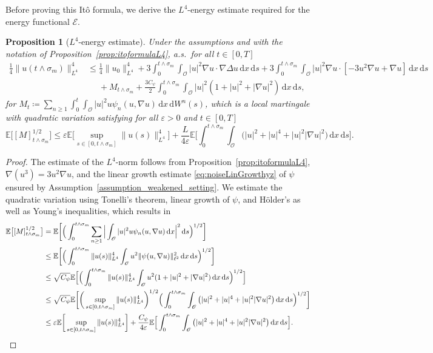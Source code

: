 \documentclass[reqno]{amsart}
\newtheorem{proposition}[Satz]{Proposition}
\newcommand{\E}{\mathbb{E}}
\newcommand{\sO}{\mathscr{O}}
\newcommand{\ce}{\coloneqq}
\newcommand{\1}{\mathbf{1}}
\newcommand{\grad}{\nabla}
\newcommand{\ds}{\,\mathrm{d}s}
\newcommand{\dx}{\,\mathrm{d}x}
\newcommand{\dWsn}{\,\mathrm{d}W^n(s)}
\newcommand{\intt}{\int_0^t}
\newcommand{\inttm}{\int_0^{t\wedge\sigma_m}}
\newcommand{\intsO}{\int_{\sO}}
\begin{document}
Before proving this Itô formula, we derive the $L^4$-energy estimate required for the energy functional $\mathcal{E}$.

\begin{proposition}[$L^4$-energy estimate] \label{prop:L4energyEstimate}
Under the assumptions and with the notation of Proposition~\ref{prop:itoformulaL4}, 
 a.s.\ for all $t\in[0,T]$
    \begin{align}\label{eq:L4energyEst}
        \frac{1}{4}\|u(t\land \sigma_m)\|_{L^4}^4 &\le \frac{1}{4}\|u_0\|_{L^4}^4 +
         3 \inttm\intsO |u|^2 \grad u \cdot \grad \Delta u \dx\ds + 3 \inttm\intsO |u|^2 \grad u \cdot [- 3u^2 \grad u + \grad u] \dx\ds \nonumber\\
        &\phantom{\le } + M_{t\land \sigma_m} + \frac{3C_\psi}{2} \inttm\intsO |u|^2 (1+|u|^2 + |\grad u|^2)  \dx \ds,
    \end{align}
    for $M_t \ce \sum_{n \geq 1} \intt\intsO |u|^2 u \psi_n(u, \grad u) \dx \dWsn$, which is a local martingale with quadratic variation satisfying for all $\varepsilon>0$ and $t\in [0,T]$
    \begin{equation}
    \label{eq:M1quadrVarEstimate}
     \E\big[[M]_{t\wedge \sigma_m}^{1/2}\big]\le  \varepsilon\E\bigg[\sup_{s\in[0,t\land \sigma_m]} \|u(s)\|^4_{L^4}\bigg]
    +\frac{L}{4\varepsilon}\E\Big[\inttm  \intsO \big(|u|^2+|u|^4+|u|^2|\grad u|^2\big)\dx\ds\Big].
    \end{equation}
\end{proposition}
\begin{proof}
     The estimate of the $L^4$-norm follows from Proposition~\ref{prop:itoformulaL4}, $\grad(u^3)=3u^2\grad u$, and the linear growth estimate \eqref{eq:noiseLinGrowthyz} of $\psi$ ensured by Assumption~\ref{assumption_weakened_setting}.
     We estimate the quadratic variation using Tonelli's theorem, linear growth of $\psi$, and Hölder's as well as Young's inequalities, which results in
\begin{align*}
    \E\big[[M]_{t\wedge \sigma_m}^{1/2}\big]
    &  =\E\bigg[\Big(\inttm \sum_{n \geq 1} \Big|\intsO |u|^2 u \psi_n(u,\grad u) \dx \Big|^2 \ds\Big)^{1/2} \bigg]\\
    & \leq \E\bigg[\Big(\inttm \|u(s)\|^4_{L^4} \intsO u^2 \|\psi(u,\grad u)\|_{\ell^2}^2\dx \ds\Big)^{1/2} \bigg] \\
    &\le \sqrt{C_\psi} \E\Big[\Big(\inttm \|u(s)\|^4_{L^4} \intsO u^2 (1+|u|^2+|\grad u|^2)\dx \ds\Big)^{1/2} \Big] \\
    &\le \sqrt{C_\psi}\E\bigg[\bigg(\sup_{s\in[0,t\land \sigma_m]} \|u(s)\|^4_{L^4}\bigg)^{1/2}\Big(\inttm \intsO \big(|u|^2+|u|^4+|u|^2|\grad u|^2\big)\dx \ds\Big)^{1/2} \bigg] \\
    &\le \varepsilon\E\bigg[\sup_{s\in[0,t\land \sigma_m]} \|u(s)\|^4_{L^4}\bigg]
    +\frac{C_\psi}{4\varepsilon}\E\Big[\inttm  \intsO \big(|u|^2+|u|^4+|u|^2|\grad u|^2\big)\dx\ds\Big]. \qedhere
\end{align*}
\end{proof}
\end{document}

